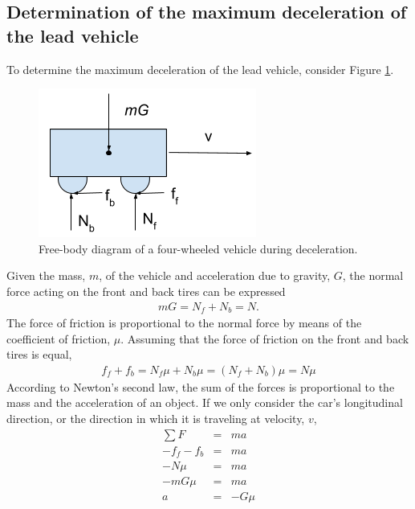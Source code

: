 \documentclass[conference]{IEEEtran}
\begin{document}




\vspace{12pt}






\onecolumn
\begin{appendix}

\subsection{Determination of the maximum deceleration of the lead vehicle}
To determine the maximum deceleration of the lead vehicle, consider Figure \ref{fig3}.

\begin{figure}[htbp]
\centerline{\includegraphics[width=2.00 in]{maxDecel.png}}
\caption{Free-body diagram of a four-wheeled vehicle during deceleration.}
\label{fig3}
\end{figure}

Given the mass, $m$, of the vehicle and acceleration due to gravity, $G$, the normal force acting on the front and back tires can be expressed
\begin{eqnarray*}
mG=N_f+N_b=N.
\end{eqnarray*}
The force of friction is proportional to the normal force by means of the coefficient of friction, $\mu$. Assuming that the force of friction on the front and back tires is equal,
\begin{eqnarray*}
f_f+f_b=N_f\mu+N_b\mu=(N_f+N_b)\mu=N\mu
\end{eqnarray*}
According to Newton's second law, the sum of the forces is proportional to the mass and the acceleration of an object. If we only consider the car's longitudinal direction, or the direction in which it is traveling at velocity, $v$,
\begin{eqnarray*}
\sum F &=& ma \\
-f_f-f_b &=& ma \\
-N\mu &=& ma \\
-mG\mu &=& ma \\
a &=& -G\mu
\end{eqnarray*}





\end{appendix}
\end{document}
